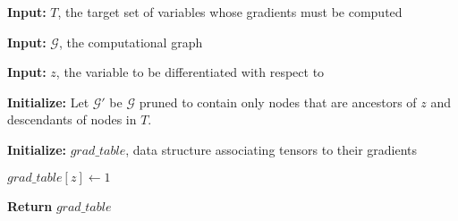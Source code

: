 \documentclass{article}
\begin{document}
    \setlength{\interspacetitleruled}{-.4pt}
    \begin{algorithm}

    
    \textbf{Input:}
    $T$, the target set of variables whose gradients must be computed

    \textbf{Input:}
    $\mathcal{G}$, the computational graph

    \textbf{Input:}
    $z$, the variable to be differentiated with respect to

	\textbf{Initialize:}
	Let $\mathcal{G}'$ be $\mathcal{G}$ pruned to contain only nodes that are ancestors of $z$ and descendants of nodes in $T$.
	
	\textbf{Initialize:}
	$grad\_table$, data structure associating tensors to their gradients
	
	$grad\_table[z] \gets 1$
	

    
    \textbf{Return} $grad\_table$
    
    \end{algorithm}
    
\end{document}
